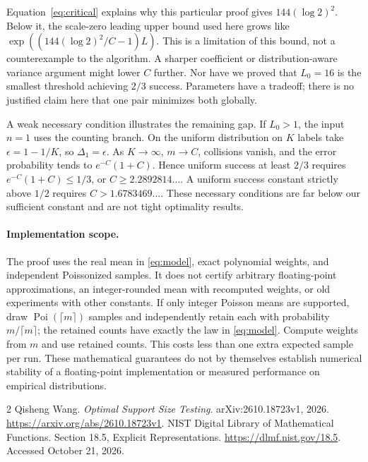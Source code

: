 \documentclass[10pt]{article}
\newcommand{\Poi}{\operatorname{Poi}}
\begin{document}
Equation~\eqref{eq:critical} explains why this particular proof gives
$144(\log2)^2$. Below it, the scale-zero leading upper bound used here grows
like $\exp((144(\log2)^2/C-1)L)$. This is a limitation of this bound, not a
counterexample to the algorithm. A sharper coefficient or distribution-aware
variance argument might lower $C$ further. Nor have we proved that $L_0=16$
is the smallest threshold achieving $2/3$ success. Parameters have a tradeoff;
there is no justified claim here that one pair minimizes both globally.

A weak necessary condition illustrates the remaining gap. If $L_0>1$, the
input $n=1$ uses the counting branch. On the uniform distribution on $K$
labels take $\epsilon=1-1/K$, so $\Delta_1=\epsilon$. As $K\to\infty$,
$m\to C$, collisions vanish, and the error probability tends to
$e^{-C}(1+C)$. Hence uniform success at least $2/3$ requires
$e^{-C}(1+C)\le1/3$, or $C\ge2.2892814\ldots$.
A uniform success constant strictly above $1/2$ requires
$C>1.6783469\ldots$. These necessary conditions are far below our sufficient
constant and are not tight optimality results.

\paragraph{Implementation scope.}
The proof uses the real mean in \eqref{eq:model}, exact polynomial weights,
and independent Poissonized samples. It does not certify arbitrary
floating-point approximations, an integer-rounded mean with recomputed
weights, or old experiments with other constants. If only integer Poisson
means are supported, draw $\Poi(\lceil m\rceil)$ samples and independently
retain each with probability $m/\lceil m\rceil$; the retained counts have
exactly the law in \eqref{eq:model}. Compute weights from $m$ and use retained
counts. This costs less than one extra expected sample per run.
These mathematical guarantees do not by themselves establish numerical
stability of a floating-point implementation or measured performance on
empirical distributions.

\begin{thebibliography}{2}
 Qisheng Wang. \emph{Optimal Support Size Testing}.
arXiv:2610.18723v1, 2026. \url{https://arxiv.org/abs/2610.18723v1}.
 NIST Digital Library of Mathematical Functions.
Section 18.5, Explicit Representations.
\url{https://dlmf.nist.gov/18.5}. Accessed October 21, 2026.
\end{thebibliography}
\appendix

\end{document}
